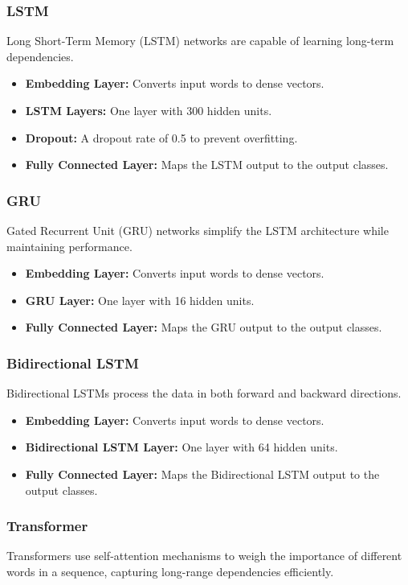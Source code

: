 \documentclass{article}
\begin{document}
\subsubsection{LSTM}
Long Short-Term Memory (LSTM) networks are capable of learning long-term dependencies.

\begin{itemize}
    \item \textbf{Embedding Layer:} Converts input words to dense vectors.
    \item \textbf{LSTM Layers:} One layer with 300 hidden units.
    \item \textbf{Dropout:} A dropout rate of 0.5 to prevent overfitting.
    \item \textbf{Fully Connected Layer:} Maps the LSTM output to the output classes.
\end{itemize}

\subsubsection{GRU}
Gated Recurrent Unit (GRU) networks simplify the LSTM architecture while maintaining performance.

\begin{itemize}
    \item \textbf{Embedding Layer:} Converts input words to dense vectors.
    \item \textbf{GRU Layer:} One layer with 16 hidden units.
    \item \textbf{Fully Connected Layer:} Maps the GRU output to the output classes.
\end{itemize}

\subsubsection{Bidirectional LSTM}
Bidirectional LSTMs process the data in both forward and backward directions.

\begin{itemize}
    \item \textbf{Embedding Layer:} Converts input words to dense vectors.
    \item \textbf{Bidirectional LSTM Layer:} One layer with 64 hidden units.
    \item \textbf{Fully Connected Layer:} Maps the Bidirectional LSTM output to the output classes.
\end{itemize}

\subsubsection{Transformer}
Transformers use self-attention mechanisms to weigh the importance of different words in a sequence, capturing long-range dependencies efficiently.
\end{document}
